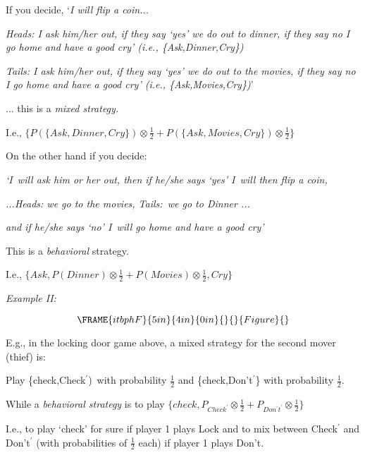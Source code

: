 \documentclass{article}
\begin{document}
\bigskip

If you decide, `\textit{I will flip a coin...}

\textit{Heads: I ask him/her out, if they say `yes' we do out to dinner, if
they say no I go home and have a good cry' (i.e., \{Ask,Dinner,Cry\})}

\textit{Tails: I ask him/her out, if they say `yes' we do out to the movies,
if they say no I go home and have a good cry' (i.e., \{Ask,Movies,Cry\})}'

... this is a \textit{mixed strategy.}

I.e., $\{P(\{Ask,Dinner,Cry\})\otimes \frac{1}{2}+P(\{Ask,Movies,Cry\})%
\otimes \frac{1}{2}\}$

\bigskip

On the other hand if you decide:

\textit{`I\ will ask him or her out, then if he/she says `yes' I\ will then
flip a coin, }

\textit{...Heads: we go to the movies, Tails:\ we go to Dinner ...}

\textit{and if he/she says `no' I\ will go home and have a good cry'}

This is a \textit{behavioral }strategy.

I.e., $\{Ask,P(Dinner)\otimes \frac{1}{2}+P(Movies)\otimes \frac{1}{2},Cry\}$

\textit{Example II:}

\bigskip 
\begin{equation}
\FRAME{itbphF}{5in}{4in}{0in}{}{}{Figure}{\special{language "Scientific
Word";type "GRAPHIC";maintain-aspect-ratio TRUE;display "USEDEF";valid_file
"T";width 5in;height 4in;depth 0in;original-width 4.264in;original-height
3.1922in;cropleft "0";croptop "1";cropright "1";cropbottom "0";tempfilename
'JSH1WT08.wmf';tempfile-properties "XPR";}}
\end{equation}

E.g., in the locking door game above, a mixed strategy for the second mover
(thief) is:

Play \{check,Check$^{\prime }$)\ with probability $\frac{1}{2}$ and
\{check,Don't$^{\prime }$\} with probability $\frac{1}{2}$.

\bigskip

While a \textit{behavioral strategy }is to play $\{check,P_{Check^{\prime
}}\otimes \frac{1}{2}+P_{Don^{\prime }t^{\prime }}\otimes \frac{1}{2}\}$

I.e., to play `check' for sure if player 1 plays Lock and to mix between
Check$^{\prime }$ and Don't$^{\prime }$ (with probabilities of $\frac{1}{2}$
each) if player 1 plays Don't.
\end{document}
